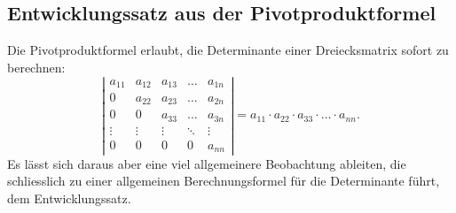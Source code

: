 %
%
%
\subsection{Entwicklungssatz aus der Pivotproduktformel}
Die Pivotproduktformel erlaubt, die Determinante einer Dreiecksmatrix sofort
zu berechnen:
\[
\left|\begin{matrix}
a_{11}&a_{12}&a_{13}&\dots &a_{1n}\\
  0   &a_{22}&a_{23}&\dots &a_{2n}\\
  0   &  0   &a_{33}&\dots &a_{3n}\\
\vdots&\vdots&\vdots&\ddots&\vdots\\
  0   &  0   &   0  &  0   &a_{nn}
\end{matrix}\right|
=
a_{11}\cdot a_{22}\cdot a_{33}\cdot\dots\cdot a_{nn}.
\]
Es lässt sich daraus aber eine viel allgemeinere Beobachtung ableiten, die
schliesslich zu einer allgemeinen Berechnungsformel für die Determinante
führt, dem Entwicklungssatz.

